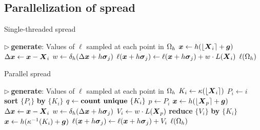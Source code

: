 \subsection{Parallelization of spread}

\begin{algorithm}
\caption{Single-threaded spread}
\label{algo:serial-spread}
\begin{algorithmic}[1]
\State $\triangleright\ $\textbf{generate}: Values of $\ell$ sampled at each point in $\Omega_h$
    \State $\boldsymbol{x} \gets h(\lfloor\boldsymbol{X}_i\rceil+\boldsymbol{g})$
    \State $\Delta\boldsymbol{x} \gets \boldsymbol{x}-\boldsymbol{X}_i$
        \State $w \gets \delta_h(\Delta\boldsymbol{x}+h\boldsymbol{\sigma}_j)$
            \State $\ell(\boldsymbol{x}+h\boldsymbol{\sigma}_j) \gets \ell(\boldsymbol{x}+h\boldsymbol{\sigma}_j) + w \cdot L(\boldsymbol{X}_i)$
        \EndIf
    \EndFor
\EndFor
\State \Return $\ell(\Omega_h)$
\EndProcedure
\end{algorithmic}
\end{algorithm}

\begin{algorithm}
\caption{Parallel spread}
\label{algo:par-spread}
\begin{algorithmic}[1]
\State $\triangleright\ $\textbf{generate}: Values of $\ell$ sampled at each point in $\Omega_h$
    \State $K_i \gets \kappa(\left\lfloor{\boldsymbol{X}_i}\right\rceil)$ 
    \State $P_i \gets i$ 
\EndFor
\State \textbf{sort} $\{P_i\}$ \textbf{by} $\{K_i\}$  \label{line:par-spread-sort}
\State $q \gets \text{\textbf{count unique} }\{K_i\}$ \label{line:par-spread-q}
        \State $p \gets P_i$
        \State $\boldsymbol{x} \gets h(\lfloor\boldsymbol{X}_p\rceil+\boldsymbol{g})$
        \State $\Delta\boldsymbol{x} \gets \boldsymbol{x}-\boldsymbol{X}_i$
        \State $w \gets \delta_h(\Delta\boldsymbol{x}+h\boldsymbol{\sigma}_j)$
        \State $V_i \gets w \cdot L(\boldsymbol{X}_p)$
    \EndFor
    \State \textbf{reduce} $\{V_i\}$ \textbf{by} $\{K_i\}$ \label{line:par-spread-reduce}
        \State $\boldsymbol{x} \gets h(\kappa^{-1}(K_i) + \boldsymbol{g})$
            \State $\ell(\boldsymbol{x} + h\boldsymbol{\sigma}_j) \gets \ell(\boldsymbol{x} + h\boldsymbol{\sigma}_j) + V_i$
        \EndIf
    \EndFor
\EndFor
\State \Return $\ell(\Omega_h)$
\EndProcedure
\end{algorithmic}
\end{algorithm}


